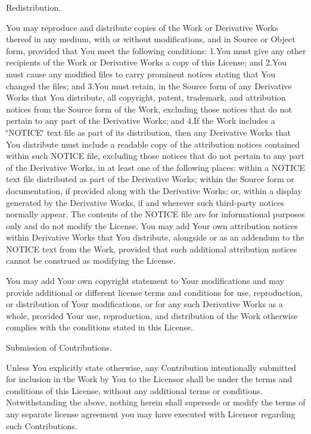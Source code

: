 \begin{DoxyEnumerate}
\item Redistribution.
\end{DoxyEnumerate}

You may reproduce and distribute copies of the Work or Derivative Works thereof in any medium, with or without modifications, and in Source or Object form, provided that You meet the following conditions\+: 1.\+You must give any other recipients of the Work or Derivative Works a copy of this License; and 2.\+You must cause any modified files to carry prominent notices stating that You changed the files; and 3.\+You must retain, in the Source form of any Derivative Works that You distribute, all copyright, patent, trademark, and attribution notices from the Source form of the Work, excluding those notices that do not pertain to any part of the Derivative Works; and 4.\+If the Work includes a \char`\"{}\+NOTICE\char`\"{} text file as part of its distribution, then any Derivative Works that You distribute must include a readable copy of the attribution notices contained within such NOTICE file, excluding those notices that do not pertain to any part of the Derivative Works, in at least one of the following places\+: within a NOTICE text file distributed as part of the Derivative Works; within the Source form or documentation, if provided along with the Derivative Works; or, within a display generated by the Derivative Works, if and wherever such third-\/party notices normally appear. The contents of the NOTICE file are for informational purposes only and do not modify the License. You may add Your own attribution notices within Derivative Works that You distribute, alongside or as an addendum to the NOTICE text from the Work, provided that such additional attribution notices cannot be construed as modifying the License.

You may add Your own copyright statement to Your modifications and may provide additional or different license terms and conditions for use, reproduction, or distribution of Your modifications, or for any such Derivative Works as a whole, provided Your use, reproduction, and distribution of the Work otherwise complies with the conditions stated in this License.


\begin{DoxyEnumerate}
\item Submission of Contributions.
\end{DoxyEnumerate}

Unless You explicitly state otherwise, any Contribution intentionally submitted for inclusion in the Work by You to the Licensor shall be under the terms and conditions of this License, without any additional terms or conditions. Notwithstanding the above, nothing herein shall supersede or modify the terms of any separate license agreement you may have executed with Licensor regarding such Contributions.


